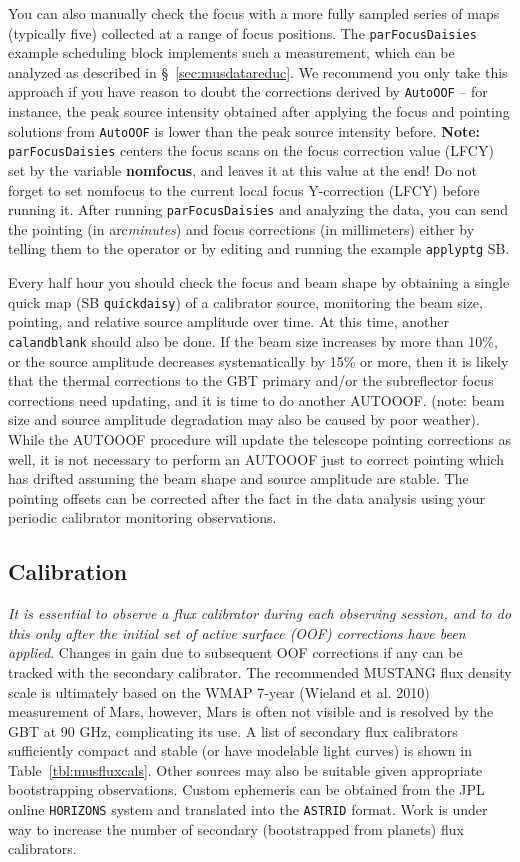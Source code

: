 You can also manually check the focus with a more fully sampled series
of maps (typically five) collected at a range of focus positions. The
{\tt parFocusDaisies} example scheduling block implements such a
measurement, which can be analyzed as described in
\S~\ref{sec:musdatareduc}. We recommend you only take this approach
if you have reason to doubt the corrections derived by {\tt AutoOOF}
-- for instance, the peak source intensity obtained after applying the
focus and pointing solutions from {\tt AutoOOF} is lower than the peak
source intensity before. {\bf Note:} {\tt parFocusDaisies} centers the
focus scans on the focus correction value (LFCY) set by the variable
{\bf nomfocus}, and leaves it at this value at the end! Do not forget
to set nomfocus to the current local focus Y-correction (LFCY) before
running it. After running {\tt parFocusDaisies} and analyzing the
data, you can send the pointing (in arc{\it minutes}) and focus
corrections (in millimeters) either by telling them to the operator or
by editing and running the example {\tt applyptg} SB.

Every half hour you should check the focus and beam shape by obtaining
a single quick map (SB {\tt quickdaisy}) of a calibrator source,
monitoring the beam size, pointing, and relative source amplitude over
time. At this time, another {\tt calandblank} should also be done.  If
the beam size increases by more than 10\%, or the source amplitude
decreases systematically by 15\% or more, then it is likely that the
thermal corrections to the GBT primary and/or the subreflector focus
corrections need updating, and it is time to do another AUTOOOF.
(note: beam size and source amplitude degradation may also be caused
by poor weather). While the AUTOOOF procedure will update the
telescope pointing corrections as well, it is not necessary to perform
an AUTOOOF just to correct pointing which has drifted assuming the
beam shape and source amplitude are stable.  The pointing offsets can
be corrected after the fact in the data analysis using your periodic
calibrator monitoring observations.

\subsection{Calibration}\label{sec:muscalib}

{\it It is essential to observe a flux calibrator during each
observing session, and to do this only after the initial set of active
surface (OOF) corrections have been applied}. Changes in gain due to
subsequent OOF corrections if any can be tracked with the secondary
calibrator. The recommended MUSTANG flux density scale is ultimately
based on the WMAP 7-year (Wieland et al. 2010) measurement of Mars,
however, Mars is often not visible and is resolved by the GBT at 90
GHz, complicating its use. A list of secondary flux calibrators
sufficiently compact and stable (or have modelable light curves) is
shown in Table~\ref{tbl:musfluxcals}.  Other sources may also be
suitable given appropriate bootstrapping observations.  Custom
ephemeris can be obtained from the JPL online {\tt HORIZONS} system
and translated into the {\tt ASTRID} format. Work is under way
to increase the number of secondary (bootstrapped from planets)
flux calibrators.

